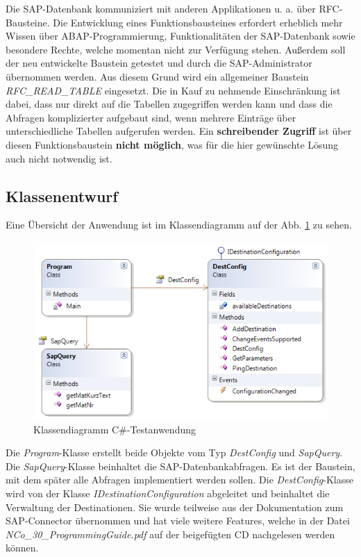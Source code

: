 Die SAP-Datenbank kommuniziert mit anderen Applikationen u. a. über RFC-Bausteine. Die Entwicklung eines Funktionsbausteines erfordert erheblich mehr Wissen über ABAP-Programmierung, Funktionalitäten der SAP-Datenbank sowie besondere Rechte, welche momentan nicht zur Verfügung stehen. Außerdem soll der neu entwickelte Baustein getestet und durch die SAP-Administrator übernommen werden. Aus diesem Grund wird ein allgemeiner Baustein \textit{RFC\_READ\_TABLE} eingesetzt. Die in Kauf zu nehmende Einschränkung ist dabei, dass nur direkt auf die Tabellen zugegriffen werden kann und dass die Abfragen komplizierter aufgebaut sind, wenn mehrere Einträge über unterschiedliche Tabellen aufgerufen werden. Ein \textbf{schreibender Zugriff} ist über diesen Funktionsbaustein \textbf{nicht möglich}, was für die hier gewünschte Lösung auch nicht notwendig ist.
\subsection{Klassenentwurf}
Eine Übersicht der Anwendung ist im Klassendiagramm auf der Abb. \ref{fig:KlassendiagrammToSap} zu sehen.

\begin{figure}[H]
\centering
\includegraphics[width=1\linewidth]{images/KlassendiagrammToSap}
\caption[Klassendiagramm C\#-Testanwendung]{Klassendiagramm C\#-Testanwendung}
\label{fig:KlassendiagrammToSap}
\end{figure}
Die \textit{Program}-Klasse erstellt beide Objekte vom Typ \textit{DestConfig} und \textit{SapQuery}. Die \textit{SapQuery}-Klasse beinhaltet die SAP-Datenbankabfragen. Es ist der Baustein, mit dem später alle Abfragen implementiert werden sollen. Die \textit{DestConfig}-Klasse wird von der Klasse \textit{IDestinationConfiguration} abgeleitet und beinhaltet die Verwaltung der Destinationen. Sie wurde teilweise aus der Dokumentation zum SAP-Connector übernommen und hat viele weitere Features, welche in der Datei \textit{NCo\_30\_ProgrammingGuide.pdf} auf der beigefügten CD nachgelesen werden können. 

